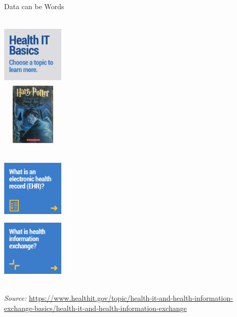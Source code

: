 \begin{frame}[t]{Data can be Words}
\centering\tiny
\begin{columns}[T]
	\includegraphics[height=3cm, width=3cm]{words/1.jpg} \\ 
	
	\includegraphics[height=3cm, width=3cm]{words/2.jpg} \\ 
\end{columns}

\vspace{10pt}
\centering\tiny 
\begin{columns}[T]
	\includegraphics[height=3cm, width=3cm]{words/3.jpg} \\ 
	
	\includegraphics[height=3cm, width=3cm]{words/4.jpg} \\
\end{columns}
\textit{Source:} 
\url{https://www.healthit.gov/topic/health-it-and-health-information-exchange-basics/health-it-and-health-information-exchange}
\end{frame}



